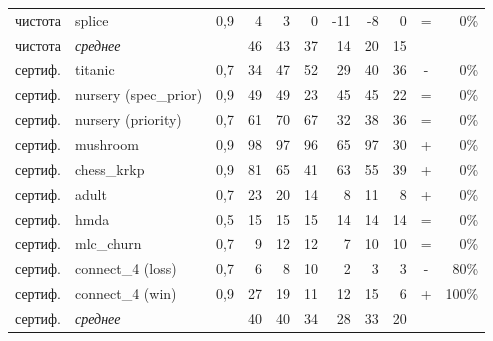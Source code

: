 \begin{tabular}{lllrrrrrrcr}
чистота & splice & 0{,}9 & 4 & 3 & 0 & -11 & -8 & 0 & = & 0\%\\
чистота & \emph{среднее} & & 46 & 43 & 37 & 14 & 20 & 15 & &\\
\midrule
сертиф. & titanic & 0{,}7 & 34 & 47 & 52 & 29 & 40 & 36 & - & 0\%\\
сертиф. & nursery (spec\_prior) & 0{,}9 & 49 & 49 & 23 & 45 & 45 & 22 & = & 0\%\\
сертиф. & nursery (priority) & 0{,}7 & 61 & 70 & 67 & 32 & 38 & 36 & = & 0\%\\
сертиф. & mushroom & 0{,}9 & 98 & 97 & 96 & 65 & 97 & 30 & + & 0\%\\
сертиф. & chess\_krkp & 0{,}9 & 81 & 65 & 41 & 63 & 55 & 39 & + & 0\%\\
сертиф. & adult & 0{,}7 & 23 & 20 & 14 & 8 & 11 & 8 & + & 0\%\\
сертиф. & hmda & 0{,}5 & 15 & 15 & 15 & 14 & 14 & 14 & = & 0\%\\
сертиф. & mlc\_churn & 0{,}7 & 9 & 12 & 12 & 7 & 10 & 10 & = & 0\%\\
сертиф. & connect\_4 (loss) & 0{,}7 & 6 & 8 & 10 & 2 & 3 & 3 & - & 80\%\\
сертиф. & connect\_4 (win) & 0{,}9 & 27 & 19 & 11 & 12 & 15 & 6 & + & 100\%\\
сертиф. & \emph{среднее} & & 40 & 40 & 34 & 28 & 33 & 20 & &\\
\bottomrule
\end{tabular}
